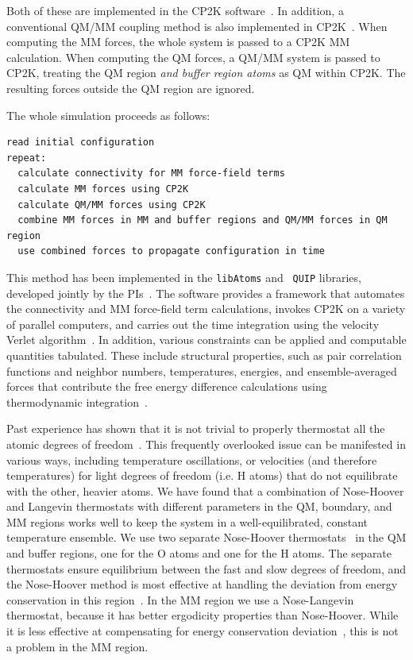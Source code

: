 \documentclass[11pt]{revtex4}
\begin{document}
Both of these are implemented in the CP2K
software~\cite{vandevondele_comp_phys_comm_2005a,laino_j_chem_theor_comp_2006a,cp2k_web}.
In addition, a conventional QM/MM coupling method is also implemented
in CP2K~\cite{laio_j_chem_phys_2002a}.  When computing the MM forces,
the whole system is passed to a CP2K MM calculation.  When computing
the QM forces, a QM/MM system is passed to CP2K, treating the QM
region {\em and buffer region atoms} as QM within CP2K.  The resulting
forces outside the QM region are ignored.

The whole simulation proceeds as follows:
\begin{verbatim}
read initial configuration
repeat:
  calculate connectivity for MM force-field terms
  calculate MM forces using CP2K
  calculate QM/MM forces using CP2K
  combine MM forces in MM and buffer regions and QM/MM forces in QM region
  use combined forces to propagate configuration in time
\end{verbatim}
This method has been implemented in the {\tt libAtoms} and {\tt
QUIP} libraries, developed jointly by the PIs~\cite{libatoms_web}.
The software provides a framework that automates the connectivity
and MM force-field term calculations, invokes CP2K on a variety of
parallel computers, and carries out the time integration using the
velocity Verlet algorithm~\cite{frenkel_2002a}.  In addition, various
constraints can be applied and computable quantities tabulated.
These include structural properties, such as pair correlation
functions and neighbor numbers, temperatures, energies, and
ensemble-averaged forces that contribute the free energy difference
calculations using thermodynamic integration~\cite{frenkel_2002b}.

Past experience has shown that it is not trivial to properly thermostat
all the atomic degrees of freedom~\cite{winfield_thesis_2009a}.
This frequently overlooked issue can be manifested in various ways,
including temperature oscillations, or velocities (and therefore
temperatures) for light degrees
of freedom (i.e. H atoms) that do not equilibrate with the other,
heavier atoms.  We have found that a combination of Nose-Hoover and
Langevin thermostats with different parameters in the QM, boundary,
and MM regions works well to keep the system in a well-equilibrated,
constant temperature ensemble.  We use two separate Nose-Hoover
thermostats~\cite{nose_mol_phys_1984a} in the QM and buffer regions,
one for the O atoms and one for the H atoms.  The separate thermostats
ensure equilibrium between the fast and slow degrees of freedom, and
the Nose-Hoover method is most effective at handling the deviation from
energy conservation in this region~\cite{winfield_thesis_2009a}.  In the
MM region we use a Nose-Langevin thermostat, because it has better ergodicity
properties than Nose-Hoover.  While it is less effective at compensating
for energy conservation deviation~\cite{winfield_thesis_2009a}, this is
not a problem in the MM region.
\end{document}
